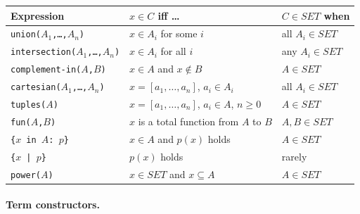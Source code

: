 \begin{center}
\footnotesize
\begin{tabular}{@{}p{4.5cm}p{4.8cm}p{3.0cm}@{}}
\toprule
Expression & $x \in C$ iff \ldots & $C \in \mathit{SET}$ when \\
\midrule
\texttt{union($A_1$,\ldots,$A_n$)} & $x \in A_i$ for some $i$ & all $A_i \in \mathit{SET}$ \\[2pt]
\texttt{intersection($A_1$,\ldots,$A_n$)} & $x \in A_i$ for all $i$ & any $A_i \in \mathit{SET}$ \\[2pt]
\texttt{complement-in($A$,$B$)} & $x \in A$ and $x \notin B$ & $A \in \mathit{SET}$ \\[2pt]
\texttt{cartesian($A_1$,\ldots,$A_n$)} & $x = [a_1,\ldots,a_n]$, $a_i \in A_i$ & all $A_i \in \mathit{SET}$ \\[2pt]
\texttt{tuples($A$)} & $x = [a_1,\ldots,a_n]$, $a_i \in A$, $n \ge 0$ & $A \in \mathit{SET}$ \\[2pt]
\texttt{fun($A$,$B$)} & $x$ is a total function from $A$ to $B$ & $A, B \in \mathit{SET}$ \\[2pt]
\texttt{\{$x$ in $A$: $p$\}} & $x \in A$ and $p(x)$ holds & $A \in \mathit{SET}$ \\[2pt]
\texttt{\{$x$ | $p$\}} & $p(x)$ holds & rarely \\[2pt]
\texttt{power($A$)} & $x \in \mathit{SET}$ and $x \subseteq A$ & $A \in \mathit{SET}$ \\
\bottomrule
\end{tabular}
\end{center}

\paragraph{Term constructors.}

